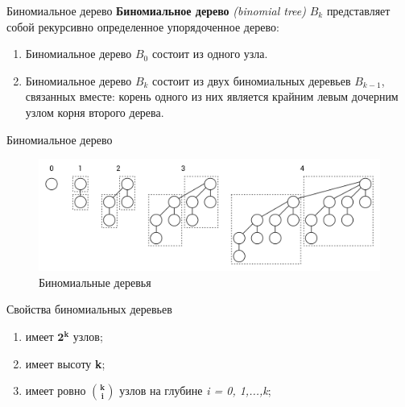 


\begin{frame}[noframenumbering]
	\titlepage
\end{frame}


\begin{frame}{Биномиальное дерево}
	\textbf{Биномиальное дерево} \textit{(binomial tree)} $B_k$ представляет собой рекурсивно определенное упорядоченное дерево:
	\begin{enumerate}
		\item Биномиальное дерево $B_0$ состоит из одного узла.
		\item Биномиальное дерево $B_k$ состоит из двух биномиальных деревьев $B_{k−1}$,
		связанных вместе: корень одного из них является крайним левым дочерним узлом корня второго дерева.
	\end{enumerate}
\end{frame}

\begin{frame}{Биномиальное дерево} 
	\begin{figure}
		\includegraphics[width=0.9\linewidth]{images/binom-trees.png}
		\caption{Биномиальные деревья}
	\end{figure}
\end{frame}


\begin{frame}{Свойства биномиальных деревьев}
	\begin{enumerate}
		\item имеет $\mathbf{2^k}$ узлов;
		\item имеет высоту \textbf{k};
		\item имеет ровно $\mathbf{\binom{k}{i}}$ узлов на глубине \textit{i = 0, 1,...,k};
	\end{enumerate}
\end{frame}


